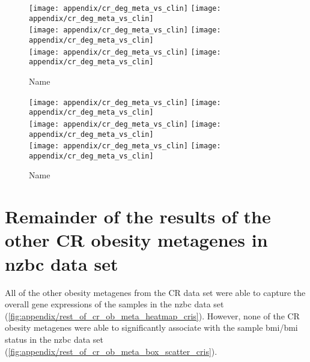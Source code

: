 \begin{appendices}
	\begin{figure}[htpb]
		\ContinuedFloat
		\captionsetup{list=off,format=cont}
		\centering
		\texttt{[image: appendix/cr\_deg\_meta\_vs\_clin]}
		\hfill
		\texttt{[image: appendix/cr\_deg\_meta\_vs\_clin]}\\
		\texttt{[image: appendix/cr\_deg\_meta\_vs\_clin]}
		\hfill
		\texttt{[image: appendix/cr\_deg\_meta\_vs\_clin]}\\
		\texttt{[image: appendix/cr\_deg\_meta\_vs\_clin]}
		\hfill
		\texttt{[image: appendix/cr\_deg\_meta\_vs\_clin]}\\
		\caption{Name}
	\end{figure}

	\begin{figure}[htpb]
		\ContinuedFloat
		\captionsetup{list=off,format=cont}
		\centering
		\texttt{[image: appendix/cr\_deg\_meta\_vs\_clin]}
		\hfill
		\texttt{[image: appendix/cr\_deg\_meta\_vs\_clin]}\\
		\texttt{[image: appendix/cr\_deg\_meta\_vs\_clin]}
		\hfill
		\texttt{[image: appendix/cr\_deg\_meta\_vs\_clin]}\\
		\texttt{[image: appendix/cr\_deg\_meta\_vs\_clin]}
		\hfill
		\texttt{[image: appendix/cr\_deg\_meta\_vs\_clin]}\\
		\caption{Name}
	\end{figure}

	\section{Remainder of the results of the other CR obesity metagenes in \gls{nzbc} data set}
	\label{sec:rest_of_the_cr_ob_meta_heatmap_results_cris}

	All of the other obesity metagenes from the CR data set were able to capture the overall gene expressions of the samples in the \gls{nzbc} data set (\cref{fig:appendix/rest_of_cr_ob_meta_heatmap_cris}).
	However, none of the CR obesity metagenes were able to significantly associate with the sample \gls{bmi}/\gls{bmi} status in the \gls{nzbc} data set (\cref{fig:appendix/rest_of_cr_ob_meta_box_scatter_cris}).


\end{appendices}
